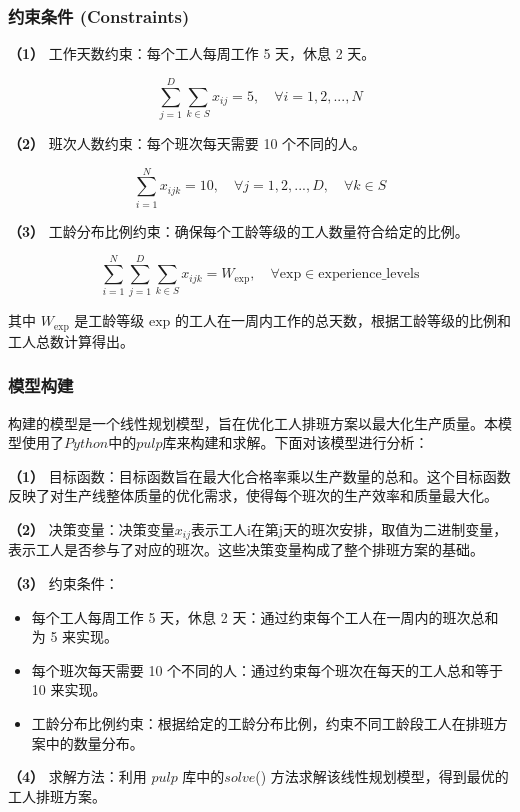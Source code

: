 \documentclass[withoutpreface,bwprint]{cumcmthesis}
\begin{document}
\subsubsection{约束条件 (Constraints)}

\textbf{（1）} 工作天数约束：每个工人每周工作 5 天，休息 2 天。

\[
\sum_{j=1}^{D} \sum_{k \in S} x_{ij} = 5, \quad \forall i = 1, 2, ..., N
\]

\textbf{（2）} 班次人数约束：每个班次每天需要 10 个不同的人。

\[
\sum_{i=1}^{N} x_{ijk} = 10, \quad \forall j = 1, 2, ..., D, \quad \forall k \in S
\]

\textbf{（3）} 工龄分布比例约束：确保每个工龄等级的工人数量符合给定的比例。

\[
\sum_{i=1}^{N} \sum_{j=1}^{D} \sum_{k \in S} x_{ijk} = W_{\text{exp}}, \quad \forall \text{exp} \in \text{experience\_levels}
\]

其中 \( W_{\text{exp}} \) 是工龄等级 \( \text{exp} \) 的工人在一周内工作的总天数，根据工龄等级的比例和工人总数计算得出。

\subsubsection{模型构建}

构建的模型是一个线性规划模型，旨在优化工人排班方案以最大化生产质量。本模型使用了\(Python\)中的\(pulp\)库来构建和求解。下面对该模型进行分析：

\textbf{（1）} 目标函数：目标函数旨在最大化合格率乘以生产数量的总和。这个目标函数反映了对生产线整体质量的优化需求，使得每个班次的生产效率和质量最大化。

\textbf{（2）} 决策变量：决策变量\(x_{ij}\)表示工人i在第j天的班次安排，取值为二进制变量，表示工人是否参与了对应的班次。这些决策变量构成了整个排班方案的基础。

\textbf{（3）} 约束条件：

\begin{itemize}
    \item 每个工人每周工作 5 天，休息 2 天：通过约束每个工人在一周内的班次总和为 5 来实现。
    \item 每个班次每天需要 10 个不同的人：通过约束每个班次在每天的工人总和等于 10 来实现。
    \item 工龄分布比例约束：根据给定的工龄分布比例，约束不同工龄段工人在排班方案中的数量分布。
\end{itemize}

\textbf{（4）} 求解方法：利用 \(pulp\) 库中的\(solve\)() 方法求解该线性规划模型，得到最优的工人排班方案。
\end{document}
